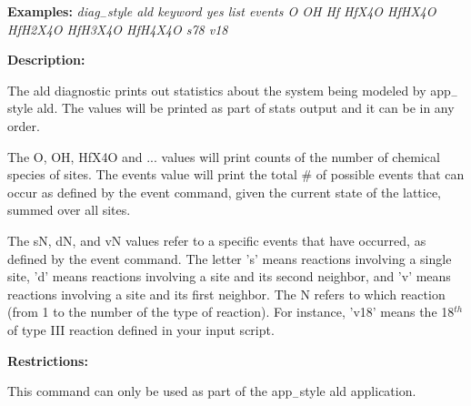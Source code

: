 \documentclass[a4paper,12pt]{report}
\begin{document}
\textbf{Examples:}
\newline
\emph{diag$_-$style ald keyword yes list events  O OH Hf HfX4O HfHX4O HfH2X4O HfH3X4O HfH4X4O s78 v18}

\textbf{Description:}
\newline

The ald diagnostic prints out statistics about the system being modeled by app$_-$style ald.
The values will be printed as part of stats output and it can be in any order.

The O, OH, HfX4O and ... values will print counts of the number of chemical species of sites.
The events value will print the total \# of possible events that can occur as defined by the event command,
given the current state of the lattice, summed over all sites.

The sN, dN, and vN values refer to a specific events that have occurred, as defined by the event command.
The letter 's' means reactions involving a single site, 'd' means reactions involving a site and its second neighbor, 
and 'v' means reactions involving a site and its first neighbor.
The N refers to which reaction (from 1 to the number of the type of reaction).
For instance, 'v18' means the 18$^{th}$ of type III reaction defined in your input script.

\textbf{Restrictions:}
\newline

This command can only be used as part of the app$_-$style ald application.

%



\end{document}
